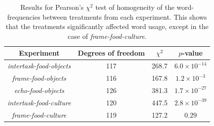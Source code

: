 \documentclass{sigchi}
\begin{document}
\begin{table}
\centering
\begin{tabular}{c c c c}
\toprule
Experiment & Degrees of freedom & $\chi^2$ & $p$-value\\
\toprule
\textit{intertask-food-objects} & 117 & 268.7 & $6.0 \times 10^{-14}$\\
\textit{frame-food-objects} & 116 & 167.8 & $1.2 \times 10^{-3}$\\
\textit{echo-food-objects} & 126 & 381.3 & $1.7 \times 10^{-27}$\\
\textit{intertask-food-culture} & 120 & 447.5 & $2.8 \times 10^{-39}$\\
\textit{frame-food-culture} & 119 & 127.2 & $0.29$\\
\bottomrule
\end{tabular}
\caption{
	Results for Pearson's $\chi^2$ test of homogeneity of the word-frequencies
	between treatments from each experiment.  This shows that the treatments
	significantly affected word usage, 
	except in the case of \textit{frame-food-culture}.
}
\label{table:chi2}
\end{table}
\end{document}
